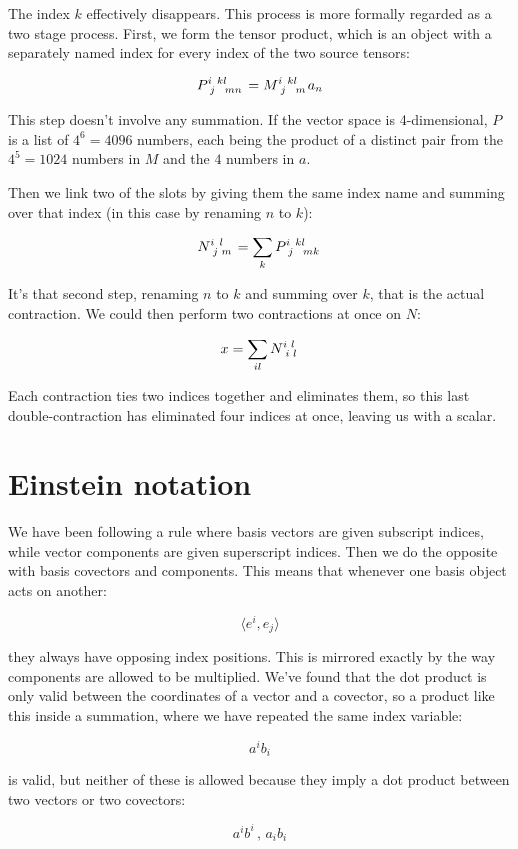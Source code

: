 The index $k$ effectively disappears. This process is more formally regarded as a two stage process. First, we form the tensor product, which is an object with a separately named index for every index of the two source tensors:

$$
P\indices{^i_j^k^l_m_n} = M\indices{^i_j^k^l_m} a_n
$$

This step doesn't involve any summation. If the vector space is 4-dimensional, $P$ is a list of $4^6 = 4096$ numbers, each being the product of a distinct pair from the $4^5 = 1024$ numbers in $M$ and the $4$ numbers in $a$.

Then we link two of the slots by giving them the same index name and summing over that index (in this case by renaming $n$ to $k$):

$$
N\indices{^i_j^l_m} = \sum_{k} P\indices{^i_j^k^l_m_k}
$$

It's that second step, renaming $n$ to $k$ and summing over $k$, that is the actual contraction. We could then perform two contractions at once on $N$:

$$
x = \sum_{il} N\indices{^i_i^l_l}
$$

Each contraction ties two indices together and eliminates them, so this last double-contraction has eliminated four indices at once, leaving us with a scalar.

\section{Einstein notation}

We have been following a rule where basis vectors are given subscript indices, while vector components are given superscript indices. Then we do the opposite with basis covectors and components. This means that whenever one basis object acts on another:

$$
\langle e^i, e_j \rangle
$$

they always have opposing index positions. This is mirrored exactly by the way components are allowed to be multiplied. We've found that the dot product is only valid between the coordinates of a vector and a covector, so a product like this inside a summation, where we have repeated the same index variable:

$$
a^i b_i
$$

is valid, but neither of these is allowed because they imply a dot product between two vectors or two covectors:

$$
a^i b^i \, , \, a_i b_i
$$

